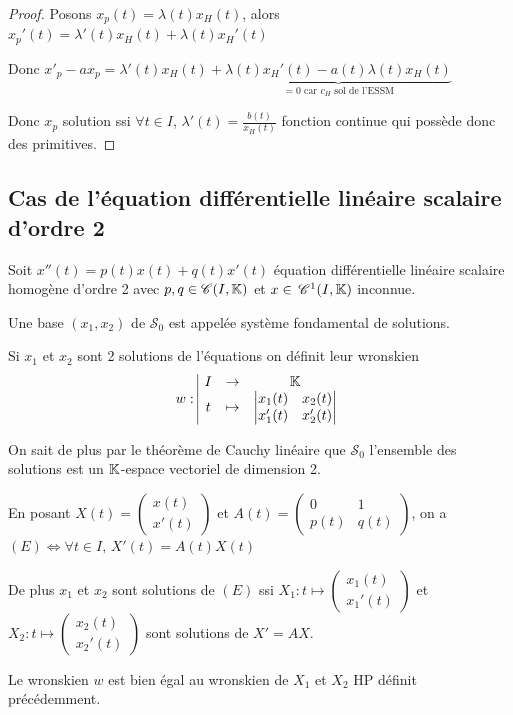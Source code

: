 \begin{proof}
    Posons $x_p(t) = \lambda(t) x_H(t)$, alors $x_p'(t) = \lambda'(t) x_H(t) + \lambda(t) x_H'(t)$

    Donc $x'_p - ax_p = \lambda'(t) x_H(t) + \underbrace{\lambda(t) x_H'(t) - a(t) \lambda(t) x_H(t)}_{ = 0 \text{ car } c_H \text{ sol de l'ESSM}}$

    Donc $x_p$ solution ssi 
    $\forall t \in I$, $\lambda'(t) = \frac{b(t)}{x_H(t)}$ fonction continue qui possède 
    donc des primitives. 
\end{proof}

\subsection{Cas de l'équation différentielle linéaire scalaire d'ordre 2}

\begin{definition}{}{}
    Soit $x''(t) = p(t) x(t) + q(t) x'(t)$ équation différentielle linéaire scalaire homogène
    d'ordre 2 avec $p, q \in \mathscr C(I, \mathbb{K})$ et $x \in \,\mathscr C^{1} (I, \mathbb{K})$ inconnue. 

    Une base $(x_1, x_2)$ de $\mathscr S_0$ est appelée système fondamental de solutions. 

    Si $x_1$ et $x_2$ sont 2 solutions de l'équations on définit leur wronskien 
    $$w: \space \begin{array}{|ccc} \displaystyle I & \to & \displaystyle \mathbb{K} \\ \displaystyle t & \mapsto & \displaystyle \begin{vmatrix}
        x_1(t) & x_2(t) \\
        x_1'(t) & x_2'(t)
    \end{vmatrix} \end{array}$$
\end{definition}

\begin{remarque}
    On sait de plus par le théorème de Cauchy linéaire que $\mathscr S_0$ l'ensemble des solutions est 
    un $\mathbb{K}$-espace vectoriel de dimension 2.
\end{remarque}

\begin{remarque}
    En posant $X(t) = \begin{pmatrix}
    x(t) \\ x'(t)
    \end{pmatrix}$ et $A(t) = \begin{pmatrix}
    0 & 1 \\
    p(t) & q(t)
    \end{pmatrix}$, on a $(E) \Leftrightarrow \forall t \in I, \, X'(t) = A(t) X(t)$

    De plus $x_1$ et $x_2$ sont solutions de $(E)$ ssi $X_1 : t \mapsto \begin{pmatrix}
    x_1(t) \\ x_1'(t)
    \end{pmatrix}$ et $X_2 : t \mapsto \begin{pmatrix}
    x_2(t) \\ x_2'(t)
    \end{pmatrix}$ sont solutions de $X' = AX$.

    Le wronskien $w$ est bien égal au wronskien de $X_1$ et $X_2$ HP définit précédemment. 
\end{remarque}

